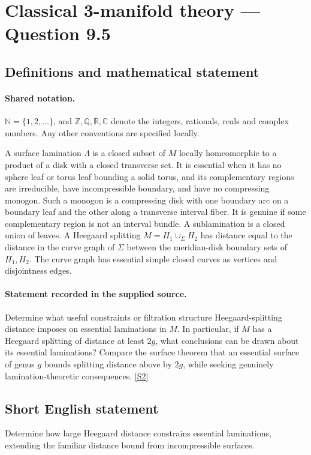\documentclass[11pt]{article}
\newcommand{\sref}[2]{\hyperlink{source:#1:#2}{[S#2]}}
\begin{document}
\section{Classical 3-manifold theory — Question 9.5}\label{statement}

\subsection{Definitions and mathematical statement}

\paragraph{Shared notation.}$\mathbb N=\{1,2,\ldots\}$, and $\mathbb Z,\mathbb Q,\mathbb R,\mathbb C$ denote the integers, rationals, reals and complex numbers. Any other conventions are specified locally.


A surface lamination $\Lambda$ is a closed subset of $M$ locally homeomorphic to a product of a disk with a closed transverse set. It is essential when it has no sphere leaf or torus leaf bounding a solid torus, and its complementary regions are irreducible, have incompressible boundary, and have no compressing monogon. Such a monogon is a compressing disk with one boundary arc on a boundary leaf and the other along a transverse interval fiber. It is genuine if some complementary region is not an interval bundle. A sublamination is a closed union of leaves. A Heegaard splitting $M=H_1\cup_\Sigma H_2$ has distance equal to the distance in the curve graph of $\Sigma$ between the meridian-disk boundary sets of $H_1,H_2$. The curve graph has essential simple closed curves as vertices and disjointness edges.
\paragraph{Statement recorded in the supplied source.}
Determine what useful constraints or filtration structure Heegaard-splitting distance imposes on essential laminations in $M$. In particular, if $M$ has a Heegaard splitting of distance at least $2g$, what conclusions can be drawn about its essential laminations? Compare the surface theorem that an essential surface of genus $g$ bounds splitting distance above by $2g$, while seeking genuinely lamination-theoretic consequences. \sref{statement}{2}
\subsection{Short English statement}
Determine how large Heegaard distance constrains essential laminations, extending the familiar distance bound from incompressible surfaces.
\end{document}
